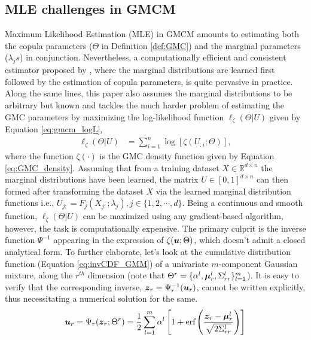 \documentclass{article}
\theoremstyle{plain}
\theoremstyle{definition}
\theoremstyle{remark}
\begin{document}
\subsection{MLE challenges in GMCM}\label{subsec:MLE_GMCM}
Maximum Likelihood Estimation (MLE) in GMCM amounts to estimating both the copula parameters ($\Theta$ in Definition \ref{def:GMC}) and the marginal parameters  ($\lambda_js$) in conjunction. Nevertheless, a computationally efficient and consistent estimator proposed by \citet{Joe1996}, where the marginal distributions are learned first followed by the estimation of copula parameters, is quite pervasive in practice. Along the same lines, this paper also assumes the marginal distributions to be arbitrary but known and tackles the much harder problem of estimating the GMC parameters by maximizing the log-likelihood function $\ell_{\zeta}(\Theta|U)$ given by Equation \eqref{eq:gmcm_logL},
\begin{align} \label{eq:gmcm_logL}
\ell_\zeta(\Theta |U) &= \sum\limits_{i=1}^{n} \log \left[\zeta(U_{:i};\Theta)\right],
\end{align}
where the function $\zeta(\cdot)$ is the GMC density function given by Equation \eqref{eq:GMC_density}. Assuming that from a training dataset $X \in \mathbb{R}^{d \times n}$ the marginal distributions have been learned, the matrix $U \in [0 , 1]^{d\times n}$ can then formed after transforming the dataset $X$ via the learned marginal distribution functions i.e., $U_{j:}=F_j(X_{j:};\lambda_j), j\in\{1,2,\cdots,d\}$. Being a continuous and smooth function, $\ell_\zeta(\Theta |U)$ can be maximized using any gradient-based algorithm, however, the task is computationally expensive. The primary culprit is the inverse function $\Psi^{-1}$ appearing in the expression of $\zeta(\boldsymbol{u};\Theta)$, which doesn't admit a closed analytical form. To further elaborate, let's look at the cumulative distribution function (Equation \ref{eq:invCDF_GMM}) of a univariate  $m$-component Gaussian mixture, along the $r^{th}$ dimension (note that $\Theta^r=\{\alpha^l,\boldsymbol{\mu}_r^l, \Sigma_{rr}^l \}_{l=1}^m$).  It is easy to verify that the corresponding inverse, $\boldsymbol{z}_r=\Psi_r^{-1}(\boldsymbol{u}_r)$, cannot be written explicitly, thus necessitating a numerical solution for the same.
\begin{equation} \label{eq:invCDF_GMM}
\boldsymbol{u}_r=\Psi_r(\boldsymbol{z}_r;\Theta^r)= \frac{1}{2}\sum\limits_{l=1}^{m} \alpha^l \left[1 + \textmd{erf}\left( \frac{\boldsymbol{z}_r-\boldsymbol{\mu}^l_r}{\sqrt{2\Sigma_{rr}^l}}\right) \right]
\end{equation} 
\end{document}
